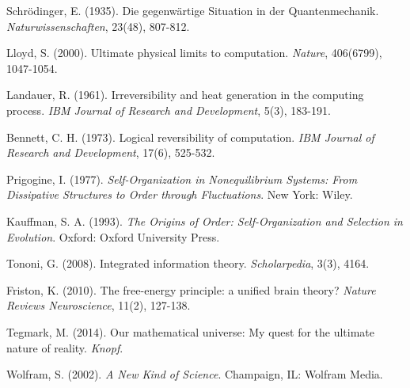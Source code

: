 \documentclass[12pt,a4paper]{article}
\begin{document}
\begin{thebibliography}{20}
Schrödinger, E. (1935). Die gegenwärtige Situation in der Quantenmechanik. \textit{Naturwissenschaften}, 23(48), 807-812.

Lloyd, S. (2000). Ultimate physical limits to computation. \textit{Nature}, 406(6799), 1047-1054.

Landauer, R. (1961). Irreversibility and heat generation in the computing process. \textit{IBM Journal of Research and Development}, 5(3), 183-191.

Bennett, C. H. (1973). Logical reversibility of computation. \textit{IBM Journal of Research and Development}, 17(6), 525-532.

Prigogine, I. (1977). \textit{Self-Organization in Nonequilibrium Systems: From Dissipative Structures to Order through Fluctuations}. New York: Wiley.

Kauffman, S. A. (1993). \textit{The Origins of Order: Self-Organization and Selection in Evolution}. Oxford: Oxford University Press.

Tononi, G. (2008). Integrated information theory. \textit{Scholarpedia}, 3(3), 4164.

Friston, K. (2010). The free-energy principle: a unified brain theory? \textit{Nature Reviews Neuroscience}, 11(2), 127-138.

Tegmark, M. (2014). Our mathematical universe: My quest for the ultimate nature of reality. \textit{Knopf}.

Wolfram, S. (2002). \textit{A New Kind of Science}. Champaign, IL: Wolfram Media.

\end{thebibliography}
\end{document}
